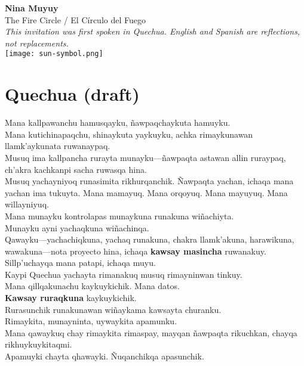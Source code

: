 \documentclass[12pt]{article}
\begin{document}
\begin{center}
    {\Huge \textbf{Nina Muyuy}} \\[0.25em]
    {\large The Fire Circle / El Círculo del Fuego} \\[0.5em]
    {\small \textit{This invitation was first spoken in Quechua. English and Spanish are reflections, not replacements.}} \\[1em]
    \texttt{[image: sun-symbol.png]} \\[0.5em]
\end{center}

\vspace{1em}
\vspace{2em}

\section*{Quechua (draft)}
\noindent
Mana kallpawanchu hamusqayku, \~nawpaqchaykuta hamuyku. \\
Mana kutichinapaqchu, shinaykuta yaykuyku, achka rimaykunawan llamk'aykunata ruwanaypaq. \\
Musuq ima kallpancha rurayta munayku---\~nawpaqta astawan allin ruraypaq, ch'akra kachkanpi sacha ruwasqa hina. \\
Musuq yachayniyoq runasimita rikhurqanchik. \~Nawpaqta yachan, ichaqa mana yachan ima tukuyta. Mana mamayuq. Mana orqoyuq. Mana mayuyuq. Mana willayniyuq. \\
Mana munayku kontrolapas munaykuna runakuna wi\~nachiyta. \\
Munayku ayni yachaqkuna wi\~nachinqa. \\
Qawayku---yachachiqkuna, yachaq runakuna, chakra llamk'akuna, harawikuna, wawakuna---nota proyecto hina, ichaqa \textbf{kawsay masincha} ruwanakuy. \\
Sillp'uchayqa mana patapi, ichaqa muyu. \\
Kaypi Quechua yachayta rimanakuq musuq rimayninwan tinkuy. \\
Mana qillqakunachu kaykuykichik. Mana datos. \\
\textbf{Kawsay ruraqkuna} kaykuykichik. \\
Rurasunchik runakunawan wi\~naykama kawsayta churanku. \\
Rimaykita, munayninta, uywaykita apamunku. \\
Mana qawaykuq chay rimaykita rimaspay, mayqan \~nawpaqta rikuchkan, chayqa rikhuykuykitaqmi. \\
Apamuyki chayta qhawayki. \~Nuqanchikqa apasunchik.
\end{document}
